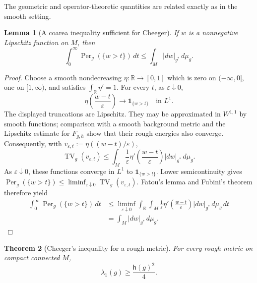 \documentclass[11pt]{amsart}
\newtheorem{theorem}{Theorem}[section]
\newtheorem{lemma}[theorem]{Lemma}
\theoremstyle{definition}
\theoremstyle{remark}
\newcommand{\TV}{\operatorname{TV}}
\newcommand{\Per}{\operatorname{Per}}
\newcommand{\dmu}[1]{\,d\mu_{#1}}
\newcommand{\one}{\mathbf 1}
\newcommand{\R}{\mathbb R}
\newcommand{\hch}{\mathsf h}
\begin{document}
The geometric and operator-theoretic quantities are related exactly as in the
smooth setting.

\begin{lemma}[A coarea inequality sufficient for Cheeger]
\label{lem:weak-coarea}
If $w$ is a nonnegative Lipschitz function on $M$, then
\begin{equation}\label{eq:weak-coarea}
 \int_0^\infty\Per_g(\{w>t\})\,dt
 \leq\int_M|dw|_{g^*}\dmu g.
\end{equation}
\end{lemma}

\begin{proof}
Choose a smooth nondecreasing $\eta:\R\to[0,1]$ which is zero on
$(-\infty,0]$, one on $[1,\infty)$, and satisfies
$\int_\R\eta'=1$.  For every $t$, as $\varepsilon\downarrow0$,
\[
 \eta\left(\frac{w-t}{\varepsilon}\right)
 \longrightarrow\one_{\{w>t\}}
 \quad\text{in }L^1.
\]
The displayed truncations are Lipschitz.  They may be approximated in
$W^{1,1}$ by smooth functions; comparison with a smooth background metric
and the Lipschitz estimate for $F_{g,h}$ show that their rough energies also
converge.
Consequently, with
$v_{\varepsilon,t}:=\eta((w-t)/\varepsilon)$,
\[
 \TV_g(v_{\varepsilon,t})
 \leq\int_M\frac1\varepsilon
 \eta'\left(\frac{w-t}{\varepsilon}\right)|dw|_{g^*}\dmu g.
\]
As $\varepsilon\downarrow0$, these functions converge in $L^1$ to
$\one_{\{w>t\}}$.  Lower semicontinuity gives
$\Per_g(\{w>t\})\leq\liminf_{\varepsilon\downarrow0}
\TV_g(v_{\varepsilon,t})$.  Fatou's lemma and Fubini's theorem therefore yield
\begin{align*}
 \int_0^\infty\Per_g(\{w>t\})\,dt
 &\leq\liminf_{\varepsilon\downarrow0}
 \int_\R\int_M
 \frac1\varepsilon\eta'\left(\frac{w-t}{\varepsilon}\right)
 |dw|_{g^*}\dmu g\,dt\\
 &=\int_M|dw|_{g^*}\dmu g.
\end{align*}
\end{proof}

\begin{theorem}[Cheeger's inequality for a rough metric]
\label{thm:rough-Cheeger}
For every rough metric on compact connected $M$,
\begin{equation}\label{eq:rough-Cheeger}
 \lambda_1(g)\geq\frac{\hch(g)^2}{4}.
\end{equation}
\end{theorem}
\end{document}
